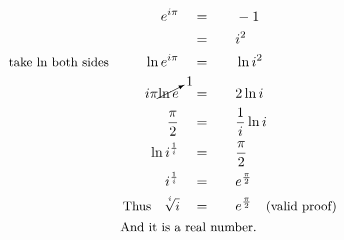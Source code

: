 \begin{alignat*}{5}
&\,&e^{i\pi}\quad&=\quad&&-1\\
&\,&\,&=&&i^2\\
&\small\text{take ln both sides}&\ln{e^{i\pi}}\quad&=&&\ln{i^2}\\
&\,&i\pi\cancelto{1}{\ln{e}}\quad&=&&2\ln{i}\\
&\,&\quad\frac{\pi}{2}\quad&=&&\frac{{1}}{i}\ln{i}\\
&\,&\quad\ln{i^\frac{1}{i}}\quad&=&&\frac{\pi}{2}\\
&\,&\quad i^\frac{1}{i}\quad&=&&e^\frac{\pi}{2}\\
&\,&\small\text{Thus}\quad\sqrt[^i]{i}\quad&=&&e^\frac{\pi}{2}\quad\small\text{(valid proof)}\\
&\rlap{\qquad\qquad\qquad\qquad\small\text{And it is a real number.}}
\end{alignat*}
